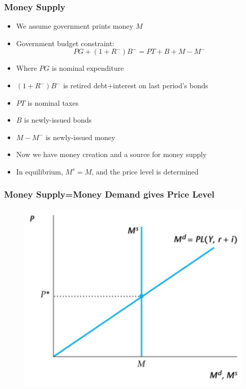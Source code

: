 \documentclass{beamer}
\begin{document}
\begin{frame}
\frametitle[alignment=center]{Money Supply}
\begin{itemize}
\item We assume government prints money $M$
\bigskip
\item Government budget constraint:
$$PG+(1+R^{-})B^{-}=PT+B+M-M^{-}$$
\item Where $PG$ is nominal expenditure
\item $(1+R^{-})B^{-}$ is retired debt+interest on last period's bonds
\item $PT$ is nominal taxes
\item $B$ is newly-issued bonds
\item $M-M^{-}$ is newly-issued money
\item Now we have money creation and a source for money supply
\item In equilibrium, $M^s=M$, and the price level is determined
\end{itemize}
\end{frame}


\begin{frame}
\frametitle[alignment=center]{Money Supply=Money Demand gives Price Level}
\begin{figure}
\centering
\includegraphics[scale=0.65]{Figures/W_Fig_12pt8.png}
\end{figure}
\end{frame}
\end{document}
